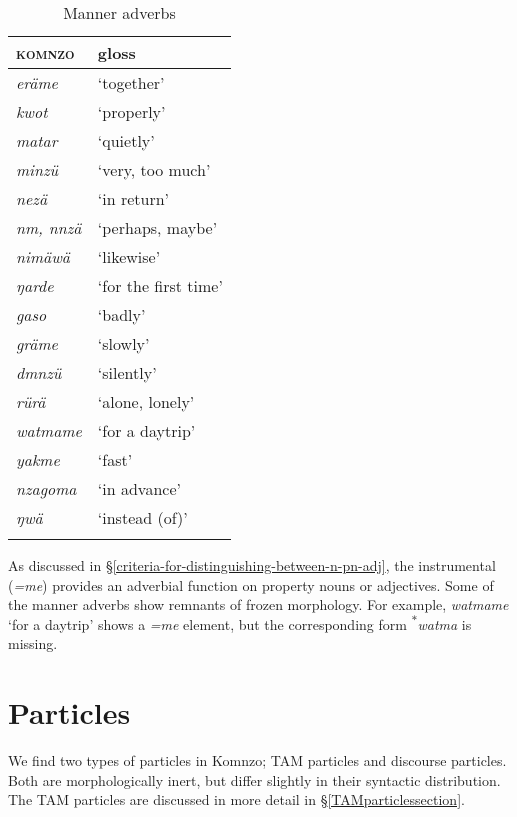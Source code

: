 \begin{table}
\caption{Manner adverbs}
\label{manner-adverbs}
	\begin{tabularx}{.5\textwidth}{Xl}
		\lsptoprule
		\textsc{komnzo}&{gloss}\\\midrule
		\emph{eräme}&`together'\\
		\emph{kwot}&`properly'\\
		\emph{matar}&`quietly'\\
		\emph{minzü}&`very, too much'\\
		\emph{nezä}&`in return'\\
		\emph{nm, nnzä}&`perhaps, maybe'\\
		\emph{nimäwä}&`likewise'\\
		\emph{ŋarde}&`for the first time'\\
		\emph{gaso}&`badly'\\
		\emph{gräme}&`slowly'\\
		\emph{dmnzü}&`silently'\\
		\emph{rürä}&`alone, lonely'\\
		\emph{watmame}&`for a daytrip'\\
		\emph{yakme}&`fast'\\
		\emph{nzagoma}&`in advance'\\
		\emph{ŋwä}&`instead (of)'\\
		\lspbottomrule
	\end{tabularx}
\end{table}%

As discussed in \S{}\ref{criteria-for-distinguishing-between-n-pn-adj}, the instrumental  (\emph{=me}) provides an adverbial function on property nouns or adjectives. Some of the manner adverbs show remnants of frozen morphology. For example, \emph{watmame} `for a daytrip' shows a \emph{=me} element, but the corresponding form \textsuperscript{$\ast$}\emph{watma} is missing.

\section{Particles} \label{particles}

We find two types of particles in Komnzo; TAM particles and discourse particles. Both are morphologically inert, but differ slightly in their syntactic distribution. The TAM particles are discussed in more detail in \S{}\ref{TAMparticlessection}.

